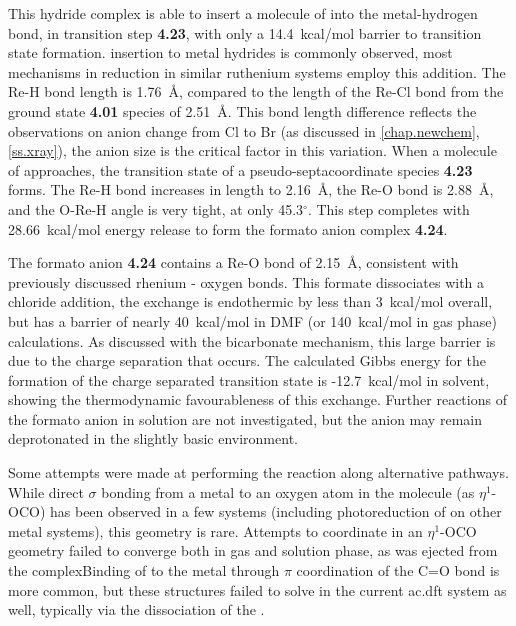 This hydride complex is able to insert a molecule of  into the metal-hydrogen bond, in transition step \textbf{4.23}, with only a 14.4~kcal/mol barrier to transition state formation.  insertion to metal hydrides is commonly observed, most mechanisms in  reduction in similar ruthenium systems employ this addition\autocite{creutz2007}. The Re-H bond length is 1.76~\r{A}, compared to the length of the Re-Cl bond from the ground state \textbf{4.01} species of 2.51~\r{A}. This bond length difference reflects the observations on anion change from Cl to Br (as discussed in \autoref{chap.newchem}, \autoref{ss.xray}), the anion size is the critical factor in this variation. When a molecule of  approaches, the transition state of a pseudo-septacoordinate species \textbf{4.23} forms. The Re-H bond increases in length to 2.16~\r{A}, the Re-O bond is 2.88~\r{A}, and the O-Re-H angle is very tight, at only 45.3$^\circ$. This step completes with 28.66~kcal/mol energy release to form the formato anion complex \textbf{4.24}. 

The formato anion \textbf{4.24} contains a Re-O bond of 2.15~\r{A}, consistent with previously discussed rhenium - oxygen bonds. This formate dissociates with a chloride addition, the exchange is endothermic by less than 3~kcal/mol overall, but has a barrier of nearly 40~kcal/mol in DMF (or 140~kcal/mol in gas phase) calculations. As discussed with the bicarbonate mechanism, this large barrier is due to the charge separation that occurs. The calculated Gibbs energy for the formation of the charge separated transition state is -12.7~kcal/mol in solvent, showing the thermodynamic favourableness of this exchange. Further reactions of the formato anion in solution are not investigated, but the anion may remain deprotonated in the slightly basic environment\autocite{morimoto2013}. 

Some attempts were made at performing the reaction along alternative pathways. While direct $\sigma$ bonding from a metal to an oxygen atom in the  molecule (as $\eta^1$-OCO) has been observed in a few systems (including photoreduction of  on other metal systems)\autocite{lee2001, mauser2001, souter1997}, this geometry is rare\autocite{castrorodriguez2004, cokoja2011, gibson1996}. Attempts to coordinate  in an $\eta^1$-OCO geometry failed to converge both in gas and solution phase, as  was ejected from the complexBinding of  to the metal through $\pi$ coordination of the C=O bond is more common\autocite{cokoja2011, gibson1996}, but these structures failed to solve in the current \gls{ac.dft} system as well, typically via the dissociation of the .

